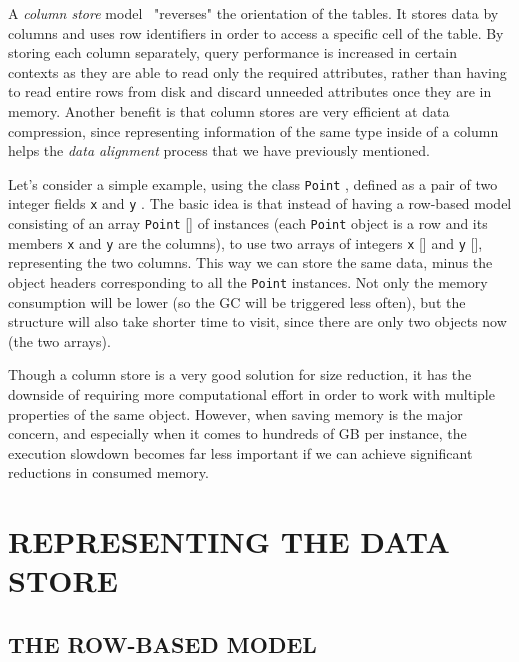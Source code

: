 \documentclass[a4paper,twoside]{article}
\begin{document}
A {\textit{column store} } model~\cite{abadi:2013} "reverses" the orientation of the tables.
It stores data by columns and uses row identifiers in order to access a specific cell of the table.
By storing each column separately, query performance is increased in certain contexts as they are able to read only the required attributes, rather than having to read entire rows from disk and discard unneeded attributes once they are in memory.
Another benefit is that column stores are very efficient at data compression, since representing information of the same type inside of a column helps the {\textit{data alignment} } process that we have previously mentioned.

Let's consider a simple example, using the class {\texttt{Point} }, defined as a pair of two integer fields {\texttt{x} } and {\texttt{y} }.
The basic idea is that instead of having a row-based model consisting of an array {\texttt{Point} []} of instances (each {\texttt{Point} } object is a row and its members {\texttt{x} } and {\texttt{y} } are the columns), to use two arrays of integers {\texttt{x} []} and {\texttt{y} []}, representing the two columns.
This way we can store the same data, minus the object headers corresponding to all the {\texttt{Point} } instances.
Not only the memory consumption will be lower (so the GC will be triggered less often), but the structure will also take shorter time to visit, since there are only two objects now (the two arrays).

Though a column store is a very good solution for size reduction, it has the downside of requiring more computational effort in order to work with multiple properties of the same object.
However, when saving memory is the major concern, and especially when it comes to hundreds of GB per instance, the execution slowdown becomes far less important if we can achieve significant reductions in consumed memory.



\section{\uppercase{Representing the Data Store}}\label{sec:uppercase4}

\subsection{\uppercase{The Row-Based Model}}\label{subsec:uppercase11}
\end{document}
